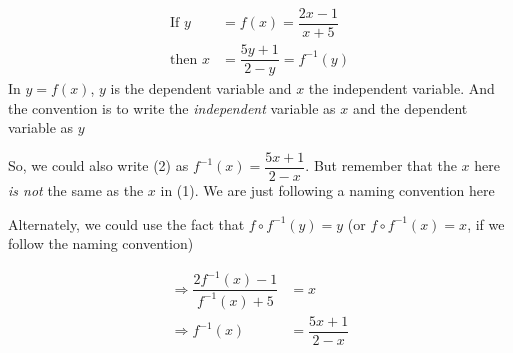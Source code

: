 \begin{solution}
	\begin{align}
		\text{If } y &= f(x) = \dfrac{2x-1}{x+5} \\
		\text{then } x &= \dfrac{5y+1}{2-y} = f^{-1}(y)
	\end{align}
	In $y = f(x)$, $y$ is the dependent variable and $x$ the independent variable. 
	And the convention is to write the \textit{independent} variable as $x$ and the 
	dependent variable as $y$
	
	So, we could also write (2) as $f^{-1}(x) = \dfrac{5x+1}{2-x}$. But remember that 
	the $x$ here \textit{is not} the same as the $x$ in (1). We are just following a naming
	convention here
	
	Alternately, we could use the fact that $f \circ f^{-1}(y) = y$ (or $f \circ f^{-1}(x) = x$, if 
	we follow the naming convention)
	
	\begin{align}
		\Rightarrow \dfrac{2f^{-1}(x)-1}{f^{-1}(x)+5} &= x \\
		\Rightarrow f^{-1}(x) &= \dfrac{5x+1}{2-x}
	\end{align}
\end{solution}
